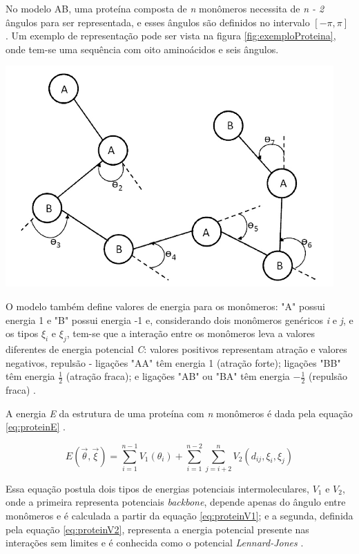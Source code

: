 No modelo AB, uma proteína composta de \textit{n} monômeros necessita de \textit{n - 2} ângulos para ser representada, e esses ângulos são definidos no intervalo $[-\pi, \pi]$ \cite{parpinelli}. Um exemplo de representação pode ser vista na figura \ref{fig:exemploProteina}, onde tem-se uma sequência com oito aminoácidos e seis ângulos.

{
    \centering
    \includegraphics[width=0.6\linewidth]{figuras/exemploProteina.png}
    \label{fig:exemploProteina}
}

O modelo também define valores de energia para os monômeros: "A" \- possui energia 1 e "B" \- possui energia -1 e, considerando dois monômeros genéricos \textit{i} e \textit{j}, e os tipos $\xi_i$ e $\xi_j$, tem-se que a interação entre os monômeros leva a valores diferentes de energia potencial \textit{C}: valores positivos representam atração e valores negativos, repulsão - ligações "AA" \- têm energia 1 (atração forte); ligações "BB" \- têm energia $\frac{1}{2}$ (atração fraca); e ligações "AB" \- ou "BA" \- têm energia $-\frac{1}{2}$ (repulsão fraca) \cite{parpinelli}.

A energia \textit{E} da estrutura de uma proteína com \textit{n} monômeros é dada pela equação \ref{eq:proteinE} \cite{parpinelli}.

\begin{equation}
    E(\Vec{\theta}, \Vec{\xi}) = \sum_{i=1}^{n-1} V_1(\theta_i) + \sum_{i=1}^{n-2} \sum_{j=i+2}^{n} V_2(d_{ij}, \xi_i, \xi_j)
\label{eq:proteinE}
\end{equation}

Essa equação postula dois tipos de energias potenciais intermoleculares, $V_1$ e $V_2$, onde a primeira representa potenciais \textit{backbone}, depende apenas do ângulo entre monômeros e é calculada a partir da equação \ref{eq:proteinV1}; e a segunda, definida pela equação \ref{eq:proteinV2}, representa a energia potencial presente nas interações sem limites e é conhecida como o potencial \textit{Lennard-Jones} \cite{parpinelli}.

